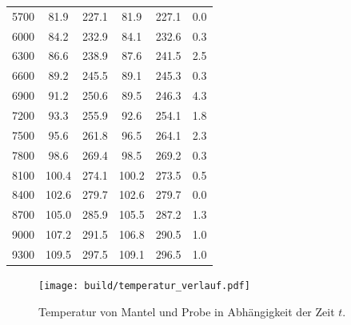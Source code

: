 \begin{table}
\begin{tabular}{c c c c c c}
  5700	&	81.9	&	227.1	&	81.9	&	227.1	&	0.0   \\
  6000	&	84.2	&	232.9	&	84.1	&	232.6	&	0.3   \\
  6300	&	86.6	&	238.9	&	87.6	&	241.5	&	2.5   \\
  6600	&	89.2	&	245.5	&	89.1	&	245.3	&	0.3   \\
  6900	&	91.2	&	250.6	&	89.5	&	246.3	&	4.3   \\
  7200	&	93.3	&	255.9	&	92.6	&	254.1	&	1.8   \\
  7500	&	95.6	&	261.8	&	96.5	&	264.1	&	2.3   \\
  7800	&	98.6	&	269.4	&	98.5	&	269.2	&	0.3   \\
  8100	&	100.4	&	274.1	&	100.2	&	273.5	&	0.5   \\
  8400	&	102.6	&	279.7	&	102.6	&	279.7	&	0.0   \\
  8700	&	105.0	&	285.9	&	105.5	&	287.2	&	1.3   \\
  9000	&	107.2	&	291.5	&	106.8	&	290.5	&	1.0   \\
  9300	&	109.5	&	297.5	&	109.1	&	296.5	&	1.0   \\

  \bottomrule
\end{tabular}
\end{table}

\begin{figure}
  \centering
  \texttt{[image: build/temperatur\_verlauf.pdf]}
  \caption{Temperatur von Mantel und Probe in Abhängigkeit der Zeit $t$.}
  \label{fig:T_mess}
\end{figure}


